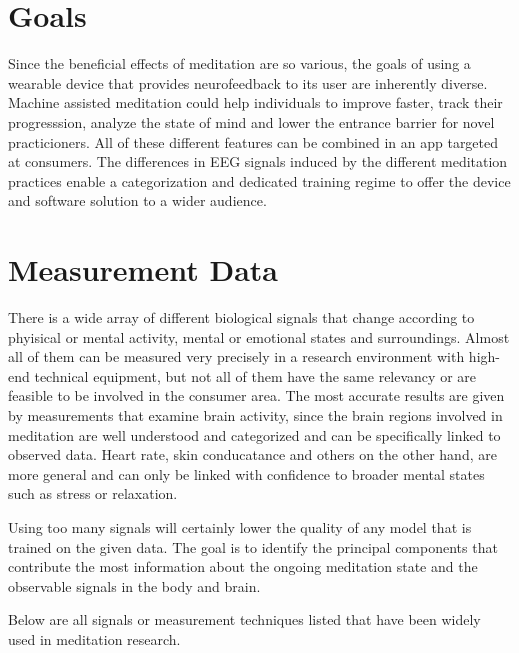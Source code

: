 \documentclass{llncs} %
\begin{document}
\section{Goals}
Since the beneficial effects of meditation are so various, the goals of using a wearable device 
that provides neurofeedback to its user are inherently diverse. Machine assisted meditation could help individuals to 
improve faster, track their progresssion, analyze the state of mind and lower the entrance barrier for novel practicioners. \cite{brand:del}
All of these different features can be combined in an app targeted at consumers. 
The differences in EEG signals induced by the different meditation practices enable a categorization
and dedicated training regime to offer the device and software solution to a wider audience. \cite{Travis}
\section{Measurement Data}
There is a wide array of different biological signals that change according to phyisical or mental activity, mental or emotional states and surroundings. Almost all of them can be measured very precisely in a research environment with high-end technical equipment, but not all of them have the same relevancy or are feasible to be involved in the consumer area. The most accurate results are given by measurements that examine brain activity, since the brain regions involved in meditation are well understood and categorized and can be specifically linked to observed data. Heart rate, skin conducatance and others on the other hand, are more general and can only be linked with confidence to broader mental states such as stress or relaxation. 
\medskip

Using too many signals will certainly lower the quality of any model that is trained on the given data. The goal is to identify the principal components that contribute the most information about the ongoing meditation state and the observable signals in the body and brain. 
\medskip

Below are all signals or measurement techniques listed that have been widely used in meditation research. 
\end{document}
